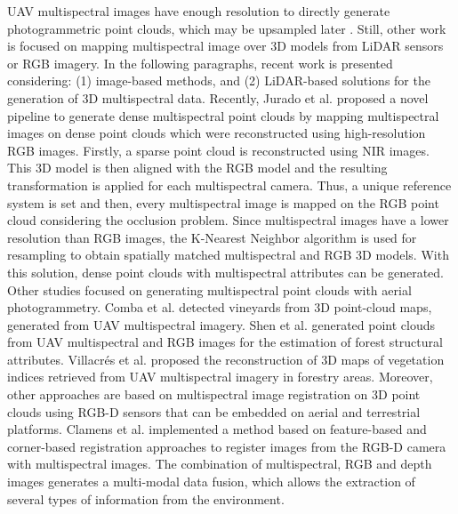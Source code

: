 UAV multispectral images have enough resolution to directly generate photogrammetric point clouds, which may be upsampled later \cite{qian_pu-gcn_2021}. Still, other work is focused on mapping multispectral image over 3D models from LiDAR sensors or RGB imagery. In the following paragraphs, recent work is presented considering: (1) image-based methods, and (2) LiDAR-based solutions for the generation of 3D multispectral data. Recently, Jurado et al. \cite{jurado_multispectral_2020} proposed a novel pipeline to generate dense multispectral point clouds by mapping multispectral images on dense point clouds which were reconstructed using high-resolution RGB images. Firstly, a sparse point cloud is reconstructed using NIR images. This 3D model is then aligned with the RGB model and the resulting transformation is applied for each multispectral camera. Thus, a unique reference system is set and then, every multispectral image is mapped on the RGB point cloud considering the occlusion problem. Since multispectral images have a lower resolution than RGB images, the K-Nearest Neighbor algorithm is used for resampling to obtain spatially matched multispectral and RGB 3D models. With this solution, dense point clouds with multispectral attributes can be generated. Other studies focused on generating multispectral point clouds with aerial photogrammetry. Comba et al. \cite{comba_unsupervised_2018} detected vineyards from 3D point-cloud maps, generated from UAV multispectral imagery. Shen et al. \cite{shen_estimation_2019} generated point clouds from UAV multispectral and RGB images for the estimation of forest structural attributes. Villacrés et al. \cite{villacres_construction_2022} proposed the reconstruction of 3D maps of vegetation indices retrieved from UAV multispectral imagery in forestry areas. Moreover, other approaches are based on multispectral image registration on 3D point clouds using RGB-D sensors that can be embedded on aerial and terrestrial platforms. Clamens et al. \cite{clamens_real-time_2021} implemented a method based on feature-based and corner-based registration approaches to register images from the RGB-D camera with multispectral images. The combination of multispectral, RGB and depth images generates a multi-modal data fusion, which allows the extraction of several types of information from the environment.

